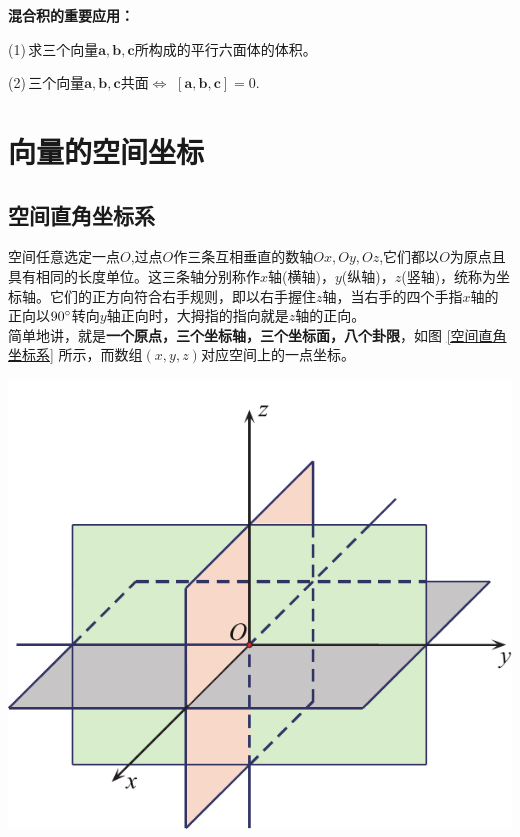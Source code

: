 \noindent\textbf{混合积的重要应用：}

(1)$\,$求三个向量$\boldsymbol{a},\boldsymbol{b},\boldsymbol{c}$所构成的平行六面体的体积。

(2)$\,$三个向量$\boldsymbol{a},\boldsymbol{b},\boldsymbol{c}$共面$\Leftrightarrow$ $[\boldsymbol{a},\boldsymbol{b},\boldsymbol{c}]=0$.

\section{向量的空间坐标}
\subsection{空间直角坐标系}
\vspace*{-0.5em}

\noindent
\begin{minipage}{0.55\linewidth}
\hspace*{2em}空间任意选定一点$O$,过点$O$作三条互相垂直的数轴$Ox,Oy,Oz$,它们都以$O$为原点且具有相同的长度单位。这三条轴分别称作$x$轴(横轴)，$y$(纵轴)，$z$(竖轴)，统称为坐标轴。它们的正方向符合右手规则，即以右手握住$z$轴，当右手的四个手指$x$轴的正向以$90 {}^{\circ}$转向$y$轴正向时，大拇指的指向就是$z$轴的正向。\\
\hspace*{2em} 简单地讲，就是\textbf{一个原点，三个坐标轴，三个坐标面，八个卦限}，如图 \ref{空间直角坐标系} 所示，而数组$(x,y,z)$对应空间上的一点坐标。
\end{minipage}
\begin{minipage}{0.45\linewidth}
	\centering
	\includegraphics[width = 0.8\linewidth]{pic/C-5/空间坐标}
	\vspace*{-1em}
	\label{空间直角坐标系}
\end{minipage}

